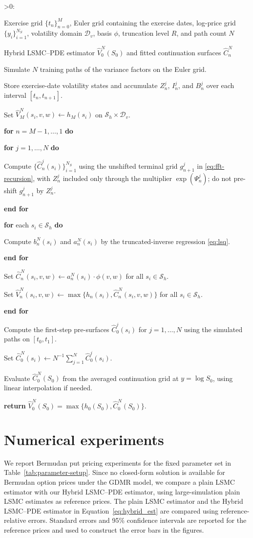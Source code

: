 \documentclass[pdflatex,sn-mathphys-num]{sn-jnl}
\makeatletter
\newcounter{ALG@line}
\newenvironment{algorithmic}[1][0]{%
  \setcounter{ALG@line}{0}%
  \def\ALG@freq{#1}%
  \begin{list}{\ifnum\ALG@freq>0\refstepcounter{ALG@line}\arabic{ALG@line}:\fi}{%
\setlength{\leftmargin}{2.2em}%
\setlength{\labelwidth}{1.8em}%
\setlength{\labelsep}{0.4em}%
\setlength{\itemsep}{2pt}%
\setlength{\parsep}{0pt}%
\setlength{\topsep}{3pt}%
  }%
}{\end{list}}
\newcommand{\Require}{\item[\textbf{Require:}]}
\newcommand{\Ensure}{\item[\textbf{Ensure:}]}
\newcommand{\State}{\item}
\newcommand{\For}[1]{\State \textbf{for} #1 \textbf{do}}
\newcommand{\EndFor}{\State \textbf{end for}}
\theoremstyle{thmstyleone}%
\theoremstyle{thmstylethree}%
\theoremstyle{thmstyletwo}%
\makeatother
\begin{document}
\begin{algorithm}[H]
\caption{Hybrid LSMC--PDE recursion}\label{alg:hybrid-lsmc-pde}
\begin{algorithmic}[1]
\Require Exercise grid $\{t_n\}_{n=0}^M$, Euler grid containing the exercise dates, log-price grid $\{y_i\}_{i=1}^{N_S}$, volatility domain $\mathcal D_v$, basis $\phi$, truncation level $R$, and path count $N$
\Ensure Hybrid LSMC--PDE estimator $\widehat V_0^N(S_0)$ and fitted continuation surfaces $\widehat C_n^N$
\State Simulate $N$ training paths of the variance factors on the Euler grid.
\State Store exercise-date volatility states and accumulate $Z_n^j$, $I_n^j$, and $B_n^j$ over each interval $[t_n,t_{n+1}]$.
\State Set $\widehat V_M^N(s_i,v,w)\gets h_M(s_i)$ on $\mathcal S_h\times\mathcal D_v$.
\For{$n=M-1,\ldots,1$}
\For{$j=1,\ldots,N$}
\State Compute $\{\widehat C_n^j(s_i)\}_{i=1}^{N_S}$ using the unshifted terminal grid $g_{n+1}^j$ in \eqref{eq:fft-recursion}, with $Z_n^j$ included only through the multiplier $\exp(\Psi_n^j)$; do not pre-shift $g_{n+1}^j$ by $Z_n^j$.
\EndFor
\For{each $s_i\in\mathcal S_h$}
\State Compute $b_n^N(s_i)$ and $a_n^N(s_i)$ by the truncated-inverse regression \eqref{eq:lsq}.
\EndFor
\State Set $\widehat C_n^N(s_i,v,w)\gets a_n^N(s_i)\cdot\phi(v,w)$ for all $s_i\in\mathcal S_h$.
\State Set $\widehat V_n^N(s_i,v,w)\gets\max\{h_n(s_i),\widehat C_n^N(s_i,v,w)\}$ for all $s_i\in\mathcal S_h$.
\EndFor
\State Compute the first-step pre-surfaces $\widehat C_0^j(s_i)$ for $j=1,\ldots,N$ using the simulated paths on $[t_0,t_1]$.
\State Set $\widehat C_0^N(s_i)\gets N^{-1}\sum_{j=1}^{N}\widehat C_0^j(s_i)$.
\State Evaluate $\widehat C_0^N(S_0)$ from the averaged continuation grid at $y=\log S_0$, using linear interpolation if needed.
\State \textbf{return} $\widehat V_0^N(S_0)=\max\{h_0(S_0),\widehat C_0^N(S_0)\}$.
\end{algorithmic}
\end{algorithm}
\section{Numerical experiments}\label{sec:numerical}

We report Bermudan put pricing experiments for the fixed parameter set in
Table~\ref{tab:parameter-setup}. Since no closed-form solution is available
for Bermudan option prices under the GDMR model, we compare a plain LSMC
estimator with our Hybrid LSMC--PDE estimator, using large-simulation plain
LSMC estimates as reference prices. The plain LSMC estimator
\cite{longstaff2001valuing} and the Hybrid LSMC--PDE estimator in
Equation~\eqref{eq:hybrid_est} are compared using reference-relative errors.
Standard errors and 95\% confidence intervals are reported for the reference
prices and used to construct the error bars in the figures.
\end{document}
